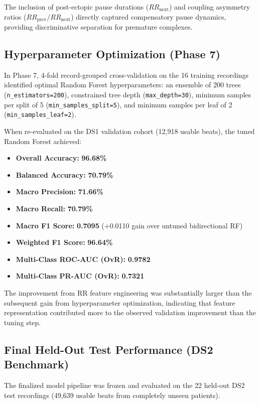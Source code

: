 \documentclass[conference]{IEEEtran}
\begin{document}
The inclusion of post-ectopic pause durations ($RR_{\text{next}}$) and coupling asymmetry ratios ($RR_{\text{prev}} / RR_{\text{next}}$) directly captured compensatory pause dynamics, providing discriminative separation for premature complexes.

\subsection{Hyperparameter Optimization (Phase 7)}
In Phase 7, 4-fold record-grouped cross-validation on the 16 training recordings identified optimal Random Forest hyperparameters: an ensemble of 200 trees (\texttt{n\_estimators=200}), constrained tree depth (\texttt{max\_depth=30}), minimum samples per split of 5 (\texttt{min\_samples\_split=5}), and minimum samples per leaf of 2 (\texttt{min\_samples\_leaf=2}).

When re-evaluated on the DS1 validation cohort (12,918 usable beats), the tuned Random Forest achieved:
\begin{itemize}
    \item \textbf{Overall Accuracy:} \textbf{96.68\%}
    \item \textbf{Balanced Accuracy:} \textbf{70.79\%}
    \item \textbf{Macro Precision:} \textbf{71.66\%}
    \item \textbf{Macro Recall:} \textbf{70.79\%}
    \item \textbf{Macro F1 Score:} \textbf{0.7095} (+0.0110 gain over untuned bidirectional RF)
    \item \textbf{Weighted F1 Score:} \textbf{96.64\%}
    \item \textbf{Multi-Class ROC-AUC (OvR):} \textbf{0.9782}
    \item \textbf{Multi-Class PR-AUC (OvR):} \textbf{0.7321}
\end{itemize}

The improvement from RR feature engineering was substantially larger than the subsequent gain from hyperparameter optimization, indicating that feature representation contributed more to the observed validation improvement than the tuning step.

\subsection{Final Held-Out Test Performance (DS2 Benchmark)}
The finalized model pipeline was frozen and evaluated on the 22 held-out DS2 test recordings (49,639 usable beats from completely unseen patients).
\end{document}
